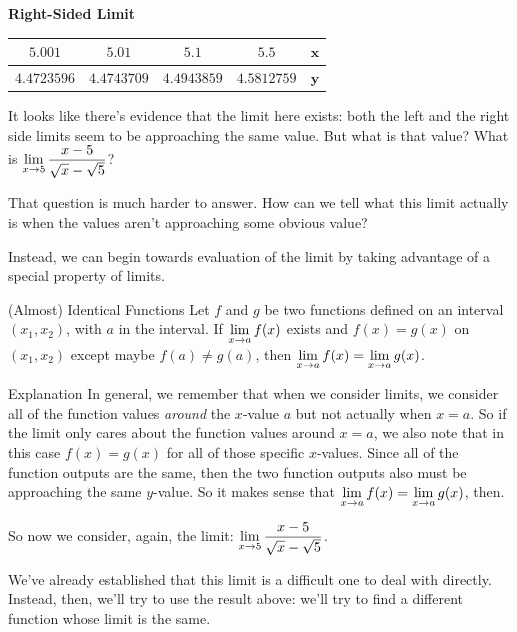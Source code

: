 \begin{flushright}
  \textbf{Right-Sided Limit}

  \begin{tabular}{ccccc} \toprule
    $5.001$ & $5.01$ & $5.1$ & $5.5$ & $\bm{x}$ \\ \midrule
    $4.4723596$ & $4.4743709$ & $4.4943859$ & $4.5812759$ & $\bm{y}$ \\ \bottomrule
  \end{tabular}
\end{flushright}

It looks like there's evidence that the limit here exists: both the left and the right side limits seem to be approaching the same value.
But what is that value?
What is $\displaystyle \lim_{x\to 5} \dfrac{x-5}{\sqrt{x}-\sqrt{5}}$?

That question is much harder to answer.
How can we tell what this limit actually is when the values aren't approaching some obvious value?

Instead, we can begin towards evaluation of the limit by taking advantage of a special property of limits.

\begin{thm}{(Almost) Identical Functions}
  Let $f$ and $g$ be two functions defined on an interval $(x_1, x_2)$, with $a$ in the interval. If $\displaystyle \lim_{x\to a} f(x)$ exists and $f(x) = g(x)$ on $(x_1,x_2)$ except maybe $f(a)\neq g(a)$, then $\displaystyle \lim_{x\to a}f(x) = \displaystyle \lim_{x\to a}g(x)$.
\end{thm}

\begin{note}{Explanation}
  In general, we remember that when we consider limits, we consider all of the function values \textit{around} the $x$-value $a$ but not actually when $x=a$.
  So if the limit only cares about the function values around $x=a$, we also note that in this case $f(x)=g(x)$ for all of those specific $x$-values.
  Since all of the function outputs are the same, then the two function outputs also must be approaching the same $y$-value.
  So it makes sense that $\displaystyle \lim_{x\to a} f(x)=\displaystyle \lim_{x\to a} g(x)$, then. \eop
\end{note}

So now we consider, again, the limit: $\displaystyle \lim_{x\to 5} \dfrac{x-5}{\sqrt{x}-\sqrt{5}}$.

We've already established that this limit is a difficult one to deal with directly.
Instead, then, we'll try to use the result above: we'll try to find a different function whose limit is the same.

